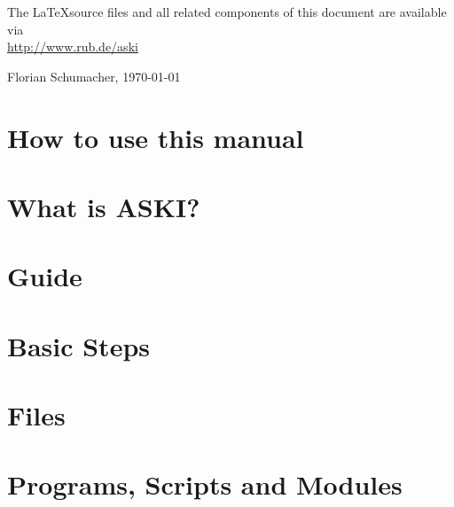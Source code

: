 \documentclass[12pt,a4paper]{book}
\newcommand{\ASKI}{{\ttfamily ASKI}}
\begin{document}
The \LaTeX source files and all related components of this document are available via\\
\url{http://www.rub.de/aski}
\begin{flushright}
Florian Schumacher, \mydate \today
\end{flushright}
%
\chapter*{How to use this manual}

%
\chapter*{What is \ASKI?} \label{guide,sec:ASKI}

%
\tableofcontents
%
\setcounter{chapter}{-1}
\chapter{Guide} \label{guide}

%
\chapter{Basic Steps} \label{basic_steps}

%
%
\chapter{Files} %

%
\chapter{Programs, Scripts and Modules} %

%


%

%
\end{document}

